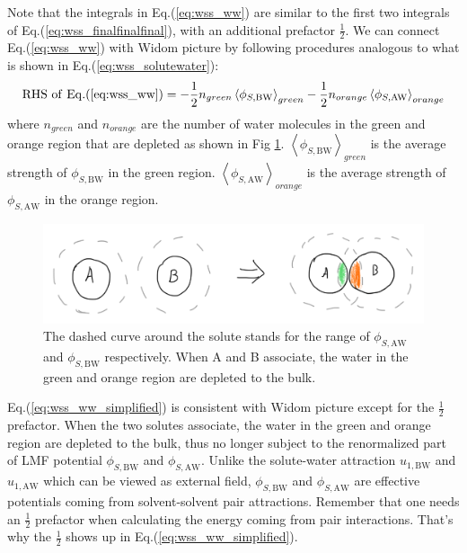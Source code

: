 \documentclass[9pt]{article}
\newcommand{\A}{\mathrm{A}}
\newcommand{\W}{\mathrm{W}}
\newcommand{\B}{\mathrm{B}}
\begin{document}
Note that the integrals in Eq.(\ref{eq:wss_ww}) are similar to the first two integrals of Eq.(\ref{eq:wss_finalfinalfinal}), with an additional prefactor $\frac{1}{2}$. We can connect Eq.(\ref{eq:wss_ww}) with Widom picture by following procedures analogous to what is shown in Eq.(\ref{eq:wss_solutewater}):
\begin{equation}
\mathrm{RHS\,\, of\,\, Eq.(\ref{eq:wss_ww})} = -\frac{1}{2} n_{green}  \left\langle \phi_{S,\B\W} \right\rangle_{green} - \frac{1}{2} n_{orange}  \left\langle \phi_{S,\A\W} \right\rangle_{orange}
\label{eq:wss_ww_simplified}
\end{equation}
where $n_{green}$ and $n_{orange}$ are the number of water molecules in the green and orange region that are depleted as shown in Fig \ref{fig:ww}. $\left\langle \phi_{S,\B\W} \right\rangle_{green}$ is the average strength of $\phi_{S,\B\W}$ in the green region. $\left\langle \phi_{S,\A\W} \right\rangle_{orange}$ is the average strength of $\phi_{S,\A\W}$ in the orange region.
\begin{figure}[htp]
\centering
\includegraphics[scale=0.35]{Fig_WW.png}
\caption{The dashed curve around the solute stands for the range of $\phi_{S,\A\W}$ and $\phi_{S,\B\W}$ respectively. When A and B associate, the water in the green and orange region are depleted to the bulk.}
\label{fig:ww}
\end{figure}


Eq.(\ref{eq:wss_ww_simplified}) is consistent with Widom picture except for the $\frac{1}{2}$ prefactor. When the two solutes associate, the water in the green and orange region are depleted to the bulk, thus no longer subject to the renormalized part of LMF potential $\phi_{S, \B\W}$ and $\phi_{S,\A\W}$. Unlike the solute-water attraction $u_{1,\B\W}  $ and $u_{1,\A\W}$ which can be viewed as external field, $\phi_{S, \B\W}$ and $\phi_{S,\A\W}$ are effective potentials coming from solvent-solvent pair attractions. Remember that one needs an $\frac{1}{2}$ prefactor when calculating the energy coming from pair interactions. That's why the $\frac{1}{2}$ shows up in Eq.(\ref{eq:wss_ww_simplified}).
\end{document}
